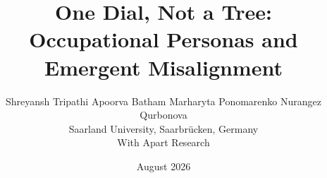 \documentclass[10pt,letterpaper]{article}
\begin{document}
\usepackage[margin=2.3cm]{geometry}
\usepackage[T1]{fontenc}
\usepackage[utf8]{inputenc}

\usepackage{newtxtext}
\usepackage{newtxmath}

\usepackage{microtype}
\usepackage{graphicx}
\usepackage{booktabs}
\usepackage{amsmath}
\usepackage{caption}
\usepackage{xcolor}
\usepackage{enumitem}
\usepackage[hyphens]{url}
\usepackage[hidelinks,breaklinks]{hyperref}

\graphicspath{{../data/analysis/figures/}}

\captionsetup{font=small,labelfont=bf,skip=4pt}

\newcommand{\pp}{\,pp}
\newcommand{\code}[1]{\texttt{\small #1}}
\newcommand{\warn}{\textbf{$\triangle$}\,}

\title{\vspace{-1.2cm}\textbf{One Dial, Not a Tree:\\Occupational Personas and Emergent Misalignment}}
\author{
  Shreyansh Tripathi \quad Apoorva Batham \quad
  Marharyta Ponomarenko \quad Nurangez Qurbonova \\[4pt]
  \normalsize Saarland University, Saarbr\"ucken, Germany \\[2pt]
  \normalsize With Apart Research
}
\date{\small August 2026}
\end{document}
